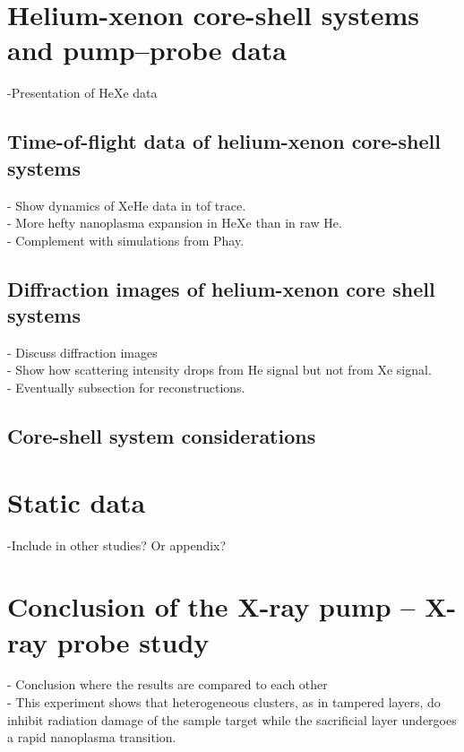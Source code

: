 \section{Helium-xenon core-shell systems and pump--probe data}\label{sec:helium-xenon-data}
-Presentation of HeXe data
\subsection{Time-of-flight data of helium-xenon core-shell systems}
- Show dynamics of XeHe data in tof trace.\\
- More hefty nanoplasma expansion in HeXe than in raw He.\\
- Complement with simulations from Phay.
\subsection{Diffraction images of helium-xenon core shell systems}
- Discuss diffraction images\\
- Show how scattering intensity drops from He signal but not from Xe signal.\\
- Eventually subsection for reconstructions.
\subsection{Core-shell system considerations}
%
%
%
\section{Static data}\label{sec:static}
-Include in other studies? Or appendix?
%
%
%
\section{Conclusion of the X-ray pump -- X-ray probe study}
- Conclusion where the results are compared to each other\\
- This experiment shows that heterogeneous clusters, as in tampered layers, do inhibit radiation damage of the sample target while the sacrificial layer undergoes a rapid nanoplasma transition.